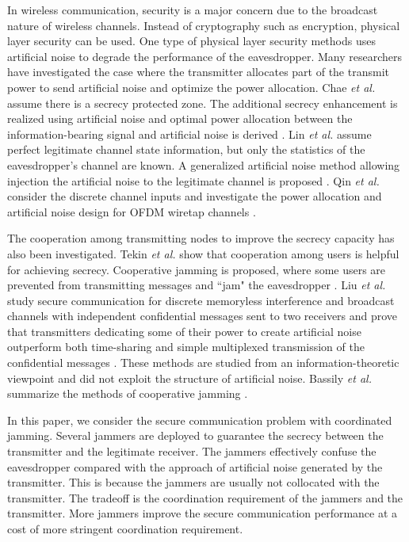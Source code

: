 \documentclass[12pt, journal,onecolumn,draftclsnofoot]{IEEEtran}
\begin{document}
In wireless communication, security is a major concern due to the broadcast nature of wireless channels. Instead of cryptography such as encryption, physical layer security can be used. One type of physical layer security methods uses artificial noise to degrade the performance of the eavesdropper. Many researchers have investigated the case where the transmitter allocates part of the transmit power to send artificial noise and optimize the power allocation. Chae \emph{et al.} assume there is a secrecy protected zone. The additional secrecy enhancement is realized using artificial noise and optimal power allocation between the information-bearing signal and artificial noise is derived \cite{chae2014enhanced}.  Lin \emph{et al.} assume perfect legitimate channel state information, but only the statistics of the eavesdropper's channel are known. A generalized artificial noise method allowing injection the artificial noise to the legitimate channel is proposed \cite{lin2013secrecy}. Qin \emph{et al.} consider the discrete channel inputs and investigate the power allocation and artificial noise design for OFDM wiretap channels \cite{qin2013power}.

The cooperation among transmitting nodes to improve the secrecy capacity has also been investigated. Tekin \emph{et al.} show that cooperation among users is helpful for achieving secrecy. Cooperative jamming is proposed,  where some users are prevented from transmitting messages and ``jam" the eavesdropper \cite{tekin2008general}. Liu \emph{et al.} study secure communication for discrete memoryless interference and broadcast channels with independent confidential messages sent to two receivers and prove that transmitters dedicating some of their power to create artificial noise outperform both time-sharing and simple multiplexed transmission of the confidential messages \cite{liu2008discrete}. These methods are studied from an information-theoretic viewpoint and did not exploit the structure of artificial noise. Bassily \emph{et al.} summarize the methods of cooperative jamming \cite{cooperative_jamming}.


In this paper, we consider the secure communication problem with coordinated jamming.   Several jammers are deployed to guarantee the secrecy between the transmitter and the legitimate receiver.  The jammers effectively confuse the eavesdropper compared with the approach of artificial noise generated by the transmitter.  This is because the jammers are usually not collocated with the transmitter.  The tradeoff is the coordination requirement of the jammers and the transmitter.  More jammers improve the secure communication performance at a cost of more stringent coordination requirement. 
\end{document}
